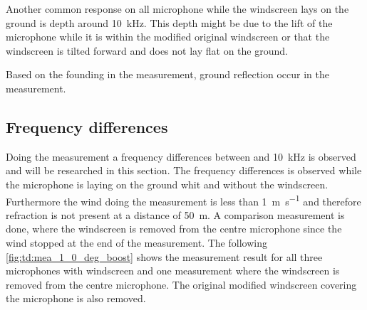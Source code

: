 Another common response on all microphone while the windscreen lays on the ground is depth around \SI{10}{\kilo\hertz}. This depth might be due to the lift of the microphone while it is within the modified original windscreen or that the windscreen is tilted forward and does not lay flat on the ground. 

Based on the founding in the measurement, ground reflection occur in the measurement.


\subsection{Frequency differences}\label{sec:des:freq_boost}
Doing the measurement a frequency differences between  and \SI{10}{\kilo\hertz} is observed and will be researched in this section. The frequency differences is observed while the microphone is laying on the ground whit and without the windscreen. Furthermore the wind doing the measurement is less than \SI{1}{\meter\per\second} and therefore refraction is not present at a distance of \SI{50}{\meter}. A comparison measurement is done, where the windscreen is removed from the centre microphone since the wind stopped at the end of the measurement. The following \autoref{fig:td:mea_1_0_deg_boost} shows the measurement result for all three microphones with windscreen and one measurement where the windscreen is removed from the centre microphone. The original modified windscreen covering the microphone is also removed. 


